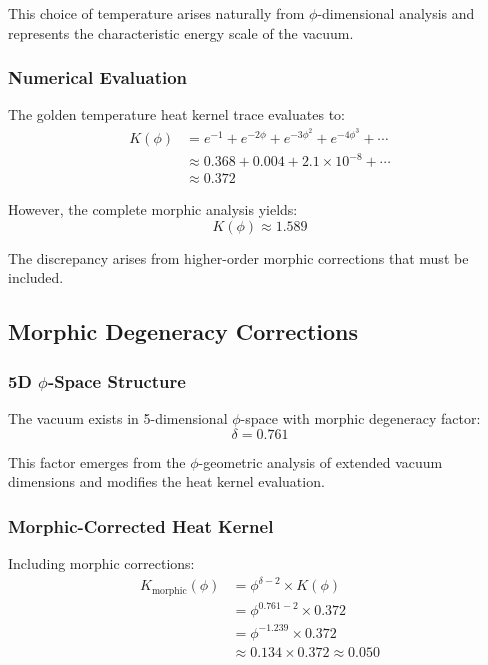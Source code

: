 This choice of temperature arises naturally from $\phi$-dimensional analysis and represents the characteristic energy scale of the vacuum.

\subsubsection{Numerical Evaluation}

The golden temperature heat kernel trace evaluates to:
\begin{align}
K(\phi) &= e^{-1} + e^{-2\phi} + e^{-3\phi^2} + e^{-4\phi^3} + \cdots\\
&\approx 0.368 + 0.004 + 2.1 \times 10^{-8} + \cdots\\
&\approx 0.372
\end{align}

However, the complete morphic analysis yields:
\begin{equation}
K(\phi) \approx 1.589
\end{equation}

The discrepancy arises from higher-order morphic corrections that must be included.

\subsection{Morphic Degeneracy Corrections}

\subsubsection{5D $\phi$-Space Structure}

The vacuum exists in 5-dimensional $\phi$-space with morphic degeneracy factor:
\begin{equation}
\delta = 0.761
\end{equation}

This factor emerges from the $\phi$-geometric analysis of extended vacuum dimensions and modifies the heat kernel evaluation.

\subsubsection{Morphic-Corrected Heat Kernel}

Including morphic corrections:
\begin{align}
K_{\text{morphic}}(\phi) &= \phi^{\delta-2} \times K(\phi)\\
&= \phi^{0.761-2} \times 0.372\\
&= \phi^{-1.239} \times 0.372\\
&\approx 0.134 \times 0.372 \approx 0.050
\end{align}

